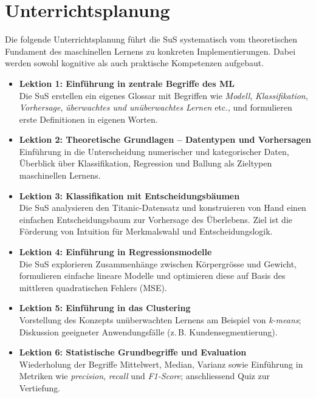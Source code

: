 \documentclass[twocolumn]{article}
\begin{document}
\section{Unterrichtsplanung}
\label{sec:planung}

Die folgende Unterrichtsplanung führt die SuS systematisch vom theoretischen Fundament des maschinellen Lernens zu konkreten Implementierungen. Dabei werden sowohl kognitive als auch praktische Kompetenzen aufgebaut.

\begin{itemize}
  \item \textbf{Lektion 1: Einführung in zentrale Begriffe des ML}\\
  Die SuS erstellen ein eigenes Glossar mit Begriffen wie \emph{Modell}, \emph{Klassifikation}, \emph{Vorhersage}, \emph{überwachtes und unüberwachtes Lernen} etc., und formulieren erste Definitionen in eigenen Worten.

  \item \textbf{Lektion 2: Theoretische Grundlagen – Datentypen und Vorhersagen}\\
  Einführung in die Unterscheidung numerischer und kategorischer Daten, Überblick über Klassifikation, Regression und Ballung als Zieltypen maschinellen Lernens.

  \item \textbf{Lektion 3: Klassifikation mit Entscheidungsbäumen}\\
  Die SuS analysieren den Titanic-Datensatz und konstruieren von Hand einen einfachen Entscheidungsbaum zur Vorhersage des Überlebens. Ziel ist die Förderung von Intuition für Merkmalswahl und Entscheidungslogik.

  \item \textbf{Lektion 4: Einführung in Regressionsmodelle}\\
  Die SuS explorieren Zusammenhänge zwischen Körpergrösse und Gewicht, formulieren einfache lineare Modelle und optimieren diese auf Basis des mittleren quadratischen Fehlers (MSE).

  \item \textbf{Lektion 5: Einführung in das Clustering}\\
  Vorstellung des Konzepts unüberwachten Lernens am Beispiel von \emph{k-means}; Diskussion geeigneter Anwendungsfälle (z. B. Kundensegmentierung).

  \item \textbf{Lektion 6: Statistische Grundbegriffe und Evaluation}\\
  Wiederholung der Begriffe Mittelwert, Median, Varianz sowie Einführung in Metriken wie \emph{precision}, \emph{recall} und \emph{F1-Score}; anschliessend Quiz zur Vertiefung.


\end{itemize}
\end{document}
